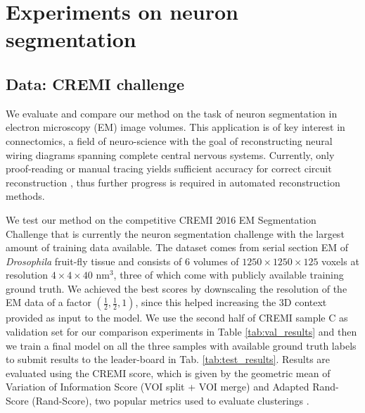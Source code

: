 
\section{Experiments on neuron segmentation}
\subsection{Data: CREMI challenge} \label{sec:cremi_challenge}
We evaluate and compare our method on the task of neuron segmentation in electron microscopy (EM) image volumes. This application is of key interest in connectomics, a field of neuro-science with the goal of reconstructing neural wiring diagrams spanning complete central nervous systems. Currently, only proof-reading or manual tracing yields sufficient accuracy for correct circuit reconstruction \cite{schlegel2017learning}, thus further progress is required in automated reconstruction methods.

We test our method on the competitive CREMI 2016 EM Segmentation Challenge \cite{cremiChallenge} that is currently the neuron segmentation challenge with the largest amount of training data available. The dataset comes from serial section EM of \emph{Drosophila} fruit-fly tissue and consists of 6 volumes of $1250\times 1250\times 125$ voxels at resolution $4\times 4\times 40$ nm$^3$, three of which come with publicly available training ground truth. 
We achieved the best scores by downscaling the resolution of the EM data of a factor $(\frac{1}{2},\frac{1}{2},1)$, since this helped increasing the 3D context provided as input to the model.
We use the second half of CREMI sample C as validation set for our comparison experiments in Table \ref{tab:val_results} and then we train a final model on all the three samples with available ground truth labels to submit results to the leader-board in Tab. \ref{tab:test_results}. 
Results  are evaluated using the CREMI score, which is given by the geometric mean of Variation of Information Score (VOI split + VOI merge) and Adapted Rand-Score (Rand-Score), two popular metrics used to evaluate clusterings \cite{arganda2015crowdsourcing}.

